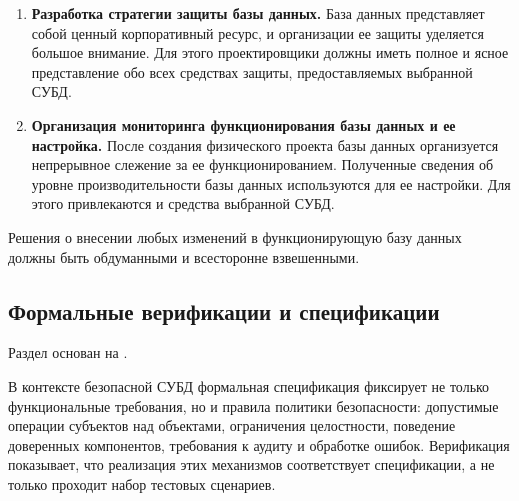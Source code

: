 \begin{enumerate}
	При этом стоит понимать, что индексы занимают место в БД. При вводе новых данных или удалении
	данных СУБД приходится обновлять и таблицы, и индексы. Это может
	замедлить выполнение операций модификации данных, особенно для таблиц
	с большим числом строк, как в хранилище данных. Таким образом, может появиться
	проблема, суть которой состоит в возникновении конфликта между
	скоростью обновления данных в таблице и скоростью ее считываний. При
	разрешении этой проблемы следует придерживаться следующего
	эмпирического правила: создавать индексы для колонок первичных ключей и
	других колонок, часто используемых в тех запросах, в которых для выборки
	данных применяются логические критерии. Если в результате скорость
	обновления данных ухудшается, то можно рассмотреть вопрос об удалении
	некоторых индексов.
        
    \item \textbf{Разработка стратегии защиты базы данных.}
        База данных представляет собой ценный корпоративный ресурс, и организации ее защиты уделяется большое
        внимание. Для этого проектировщики должны иметь полное и ясное представление обо всех средствах защиты,
        предоставляемых выбранной СУБД.

    \item \textbf{Организация мониторинга функционирования базы данных и ее настройка.}
        После создания физического проекта базы данных организуется непрерывное слежение за ее функционированием.
        Полученные сведения об уровне производительности базы данных используются для ее настройки. Для этого
        привлекаются и средства выбранной СУБД.
\end{enumerate}

Решения о внесении любых изменений в функционирующую базу данных должны быть обдуманными и всесторонне взвешенными.

\subsection{Формальные верификации и спецификации}
Раздел основан на \autocite{Glukharev}.

В контексте безопасной СУБД формальная спецификация фиксирует не только функциональные требования,
но и правила политики безопасности: допустимые операции субъектов над объектами, ограничения целостности,
поведение доверенных компонентов, требования к аудиту и обработке ошибок. Верификация показывает, что
реализация этих механизмов соответствует спецификации, а не только проходит набор тестовых сценариев.

